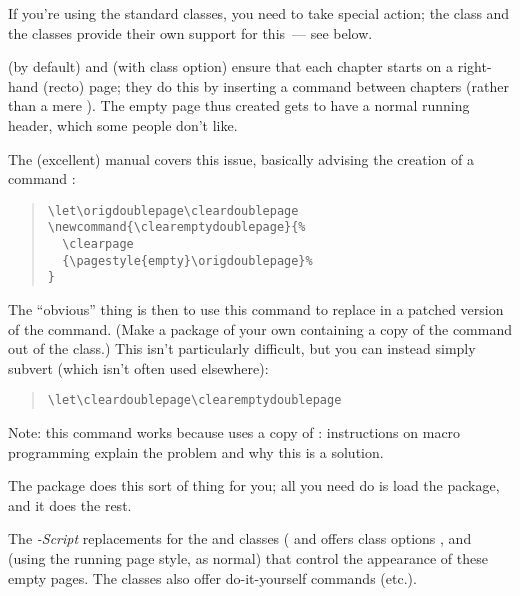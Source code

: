 
If you're using the standard classes, you need to take special action;
the  class and the  classes provide
their own support for this~--- see below. 

 (by default) and  (with  class
option) ensure that each chapter starts on a right-hand (recto) page;
they do this by inserting a  command between
chapters (rather than a mere ).  The empty page thus
created gets to have a normal running header, which some people don't
like.

The (excellent)  manual covers this issue, basically
advising the creation of a command :
\begin{quote}
\begin{verbatim}
\let\origdoublepage\cleardoublepage
\newcommand{\clearemptydoublepage}{%
  \clearpage
  {\pagestyle{empty}\origdoublepage}%
}
\end{verbatim}
\end{quote}
The ``obvious'' thing is then to use this command to replace
 in a patched version of the  command.
(Make a package of your own containing a copy 
of the command out of the class.)  This isn't particularly difficult,
but you can instead simply subvert  (which isn't
often used elsewhere):
\begin{quote}
\begin{verbatim}
\let\cleardoublepage\clearemptydoublepage
\end{verbatim}
\end{quote}
Note: this command works because  uses a copy
of : instructions on macro programming
 explain the problem and
why this is a solution.

The  package does this sort of thing for you; all
you need do is load the package, and it does the rest.

The \emph{-Script} replacements for the
 and  classes ( and
 offers class options ,
 and 
(using the running page style, as normal) that control the appearance
of these empty pages.  The classes also offer do-it-yourself commands
 (etc.\@).

